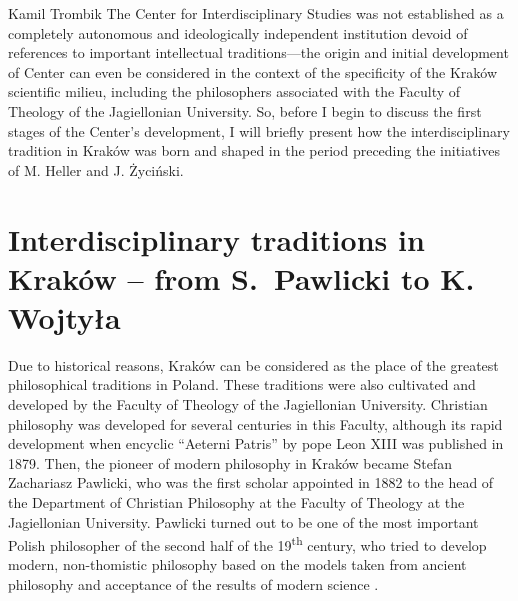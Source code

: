 \begin{artengenv}{Kamil Trombik}
The Center for Interdisciplinary Studies was not established as a completely autonomous and ideologically independent
institution devoid of references to important intellectual traditions---the origin and initial development of Center can
even be considered in the context of the specificity of the Kraków scientific milieu, including the philosophers
associated with the Faculty of Theology of the Jagiellonian University. So, before I begin to discuss the first stages
of the Center's development, I will briefly present how the interdisciplinary tradition in Kraków was born and shaped
in the period preceding the initiatives of M. Heller and J. Życiński.

\section{Interdisciplinary traditions in Kraków -- from S.~Pawlicki to K. Wojtyła}

Due to historical reasons, Kraków can be considered as the place of the greatest philosophical
traditions in Poland. These traditions were also cultivated and developed by the Faculty of Theology of the
Jagiellonian University. Christian philosophy was developed for several centuries in this Faculty, although its rapid
development when encyclic ``Aeterni Patris'' by pope Leon XIII was published in 1879. Then, the pioneer of modern
philosophy in Kraków became Stefan Zachariasz Pawlicki, who was the first scholar appointed in 1882 to the head of the
Department of Christian Philosophy at the Faculty of Theology at the Jagiellonian University. Pawlicki turned out to be
one of the most important Polish philosopher of the second half of the
19\textsuperscript{th} century, who tried to develop modern, non-thomistic
philosophy based on the models taken from ancient philosophy and acceptance of the results of modern science 
\parencite{polak_rola_2017}.


\end{artengenv}
